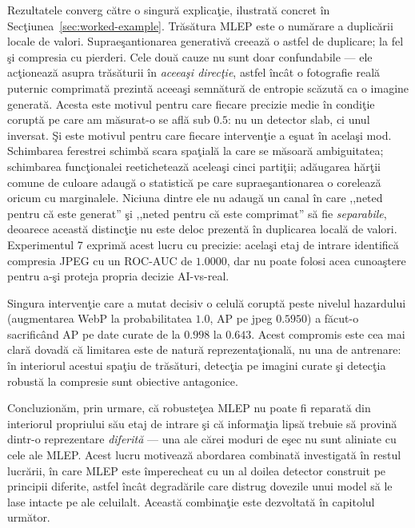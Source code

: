 Rezultatele converg către o singură explicaţie, ilustrată concret în
Secţiunea~\ref{sec:worked-example}. Trăsătura MLEP este o numărare a duplicării
locale de valori. Supraeşantionarea generativă creează o astfel de duplicare;
la fel şi compresia cu pierderi. Cele două cauze nu sunt doar confundabile ---
ele acţionează asupra trăsăturii în \emph{aceeaşi direcţie}, astfel încât o
fotografie reală puternic comprimată prezintă aceeaşi semnătură de entropie
scăzută ca o imagine generată. Acesta este motivul pentru care fiecare precizie
medie în condiţie coruptă pe care am măsurat-o se află sub $0.5$: nu un detector
slab, ci unul inversat. Şi este motivul pentru care fiecare intervenţie a eşuat
în acelaşi mod. Schimbarea ferestrei schimbă scara spaţială la care se măsoară
ambiguitatea; schimbarea funcţionalei reetichetează aceleaşi cinci partiţii;
adăugarea hărţii comune de culoare adaugă o statistică pe care
supraeşantionarea o corelează oricum cu marginalele. Niciuna dintre ele nu
adaugă un canal în care ,,neted pentru că este generat'' şi ,,neted pentru că
este comprimat'' să fie \emph{separabile}, deoarece această distincţie nu este
deloc prezentă în duplicarea locală de valori. Experimentul 7 exprimă acest
lucru cu precizie: acelaşi etaj de intrare identifică compresia JPEG cu un
ROC-AUC de $1.0000$, dar nu poate folosi acea cunoaştere pentru a-şi proteja
propria decizie AI-vs-real.

Singura intervenţie care a mutat decisiv o celulă coruptă peste nivelul
hazardului (augmentarea WebP la probabilitatea $1.0$, AP pe jpeg $0.5950$) a
făcut-o sacrificând AP pe date curate de la $0.998$ la $0.643$. Acest compromis
este cea mai clară dovadă că limitarea este de natură reprezentaţională, nu una
de antrenare: în interiorul acestui spaţiu de trăsături, detecţia pe imagini
curate şi detecţia robustă la compresie sunt obiective antagonice.

Concluzionăm, prin urmare, că robusteţea MLEP nu poate fi reparată din interiorul
propriului său etaj de intrare şi că informaţia lipsă trebuie să provină dintr-o
reprezentare \emph{diferită} --- una ale cărei moduri de eşec nu sunt aliniate cu
cele ale MLEP. Acest lucru motivează abordarea combinată investigată în restul
lucrării, în care MLEP este împerecheat cu un al doilea detector construit pe
principii diferite, astfel încât degradările care distrug dovezile unui model să
le lase intacte pe ale celuilalt. Această combinaţie este dezvoltată în capitolul
următor.
